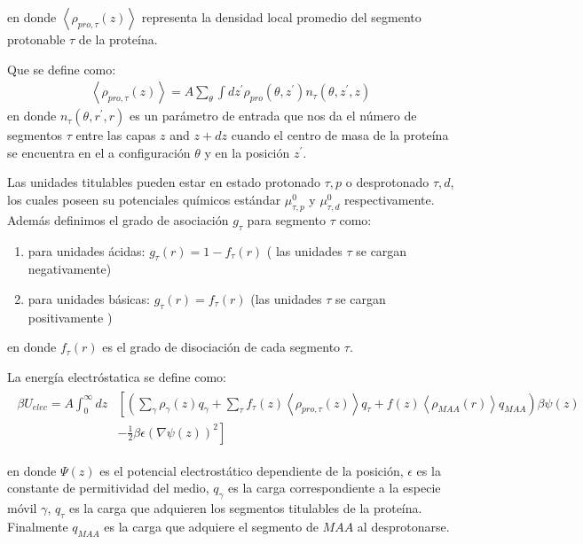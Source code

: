 \noindent en donde $\left<\rho_{pro,\tau}(z)\right>$ representa la densidad local promedio del segmento protonable $\tau$ de la prote\'ina.

Que se define como:
\begin{align}
	\left<\rho_{pro,\tau}(z)\right> = A\sum_\theta \int dz^\prime  \rho_{pro}(\theta,z^\prime)n_\tau(\theta,z^\prime, z)
	\label{eq:film:segments_pro_si}
\end{align}
\noindent en donde $n_\tau(\theta,r^\prime, r)$ es un par\'ametro de entrada que nos da el n\'umero de segmentos $\tau$ entre las capas $z$ and $z+ dz$ cuando el centro de masa de la prote\'ina se encuentra en el a configuraci\'on $\theta$ y en la posici\'on $z^\prime$.

Las unidades titulables pueden estar en estado protonado $\tau, p$ o desprotonado $\tau, d$, los cuales poseen su potenciales qu\'imicos est\'andar $\mu^0_{\tau,p}$ y $\mu^0_{\tau,d}$ respectivamente. 
Adem\'as definimos el grado de asociaci\'on $g_\tau$ para segmento $\tau$ como:


\begin{enumerate}
	\item para unidades \'acidas: $g_\tau(r) = 1-f_\tau(r)$ ( las unidades $\tau$ se cargan negativamente)
	\item para unidades b\'asicas: $g_\tau(r) = f_\tau(r)$ (las  unidades $\tau$ se cargan positivamente  )
\end{enumerate}
en donde  $f_\tau(r)$ es el grado de disociaci\'on de cada segmento $\tau$.

La energ\'ia electr\'ostatica se define como:
\begin{align}
	\begin{aligned}
		\beta U_{elec}= A\int_0^\infty dz&\left[\left(\sum_{\gamma } {\rho_\gamma(z) q_\gamma + \sum_\tau{f_\tau(z) \left<\rho_{pro,\tau}(z)\right> q_\tau} +  f(z)\left<\rho_{MAA}(r)\right>q_{MAA}}\right)\beta\psi(z) \right. \\ &\left.-\frac{1}{2}\beta\epsilon(\nabla\psi(z))^2 \right]
	\end{aligned}
\end{align} 

\noindent en donde $\Psi(z)$ es el potencial electrost\'atico dependiente de la posici\'on, $\epsilon$ es la constante de permitividad del medio, $q_\gamma$ es la carga correspondiente a la especie m\'ovil $\gamma$, $q_\tau$ es la carga que adquieren los segmentos titulables de la prote\'ina. Finalmente $q_{MAA}$ es la carga que adquiere el segmento de $MAA$ al desprotonarse.


